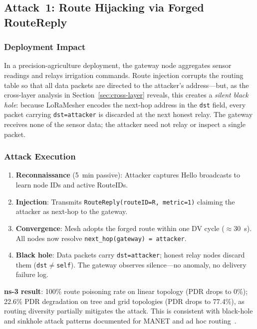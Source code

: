 \documentclass[preprint,12pt]{elsarticle}
\begin{document}
\subsection{Attack~1: Route Hijacking via Forged RouteReply}

\subsubsection{Deployment Impact}
In a precision-agriculture deployment, the gateway node aggregates
sensor readings and relays irrigation commands.
Route injection corrupts the routing table so that all data packets
are directed to the attacker's address—but, as the cross-layer
analysis in Section~\ref{sec:cross-layer} reveals, this creates a
\emph{silent black hole}: because LoRaMesher encodes the next-hop
address in the \texttt{dst} field, every packet carrying
\texttt{dst=attacker} is discarded at the next honest relay.
The gateway receives none of the sensor data; the attacker need not
relay or inspect a single packet.

\subsubsection{Attack Execution}
\begin{enumerate}
  \item \textbf{Reconnaissance} (5~min passive): Attacker captures
    Hello broadcasts to learn node IDs and active RouteIDs.
  \item \textbf{Injection}: Transmits
    \texttt{RouteReply(routeID=R, metric=1)} claiming the attacker
    as next-hop to the gateway.
  \item \textbf{Convergence}: Mesh adopts the forged route within
    one DV cycle ($\approx$30~s). All nodes now resolve
    \texttt{next\_hop(gateway) = attacker}.
  \item \textbf{Black hole}: Data packets carry \texttt{dst=attacker};
    honest relay nodes discard them (\texttt{dst}$\neq$\texttt{self}).
    The gateway observes silence—no anomaly, no delivery failure log.
\end{enumerate}

\textbf{ns-3 result}: 100\% route poisoning rate on linear topology
(PDR drops to 0\%); 22.6\% PDR degradation on tree and grid topologies
(PDR drops to 77.4\%), as routing diversity partially mitigates the attack.
This is consistent with black-hole and sinkhole attack patterns
documented for MANET and ad hoc routing~\cite{ahmad2024-sinkhole-reputation,ieee2025-blackhole-optimization,hu2002-sead}.
\end{document}
